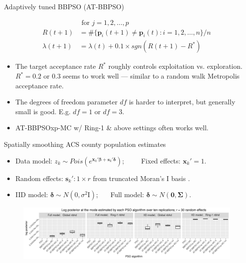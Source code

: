 \documentclass[svgnames, final]{beamer} %
\begin{document}
\begin{frame}{}
\begin{columns}[T]
\begin{column}{0.32\textwidth}
\begin{block}{\large Adaptively tuned BBPSO (AT-BBPSO)}
\begin{itemize}
\begin{align*}
                             &\mbox{ for } j=1,2,\dots,p\\
            R(t+1) &= \#\{\bm{p}_i(t+1)\neq \bm{p}_i(t): i=1,2,\dots,n\}/n\\
            \lambda(t+1) &= \lambda(t) + 0.1\times sgn(R(t+1) - R^*)
          \end{align*}
        \end{itemize}
        \begin{itemize} 
          \setlength{\itemsep0.5em}
        \item The target acceptance rate $R^*$ roughly controls exploitation vs. exploration. $R^* = 0.2$ or $0.3$ seems to work well --- similar to a random walk Metropolis acceptance rate.
        \item The degrees of freedom parameter $df$ is harder to interpret, but generally small is good. E.g. $df=1$ or $df=3$.
        \item AT-BBPSOxp-MC w/ Ring-1 \& above settings often works well.
        \end{itemize}
      \end{block}
      \vfill
      \begin{block}{\large Spatially smoothing ACS county population estimates}
        \begin{itemize}\setlength{\itemsep0.5em}
        \item Data model: $z_k \sim Pois\left(e^{\bm{x}_k'\bm{\beta} + \bm{s}_k'\bm{\delta}}\right)$;\ \ \ \ \  Fixed effects: $\bm{x}_k' = 1$.
        \item Random effects: $\bm{s}_k':1\times r$ from truncated Moran's I basis \citep{hughes2013dimension,porter2015bayesian}.
        \item IID model: $\bm{\delta} \sim N(0,\sigma^2\bm{\mathrm{I}})$; \ \ \ Full model: $\bm{\delta} \sim N(\bm{0}, \bm{\Sigma})$.
        \end{itemize}
        \begin{figure}
          \centering
          \includegraphics[scale=1]{../pop/maxplotpost.png}
        \end{figure}
        \end{block}
    \end{column}


\end{columns}
\end{frame}
\end{document}
